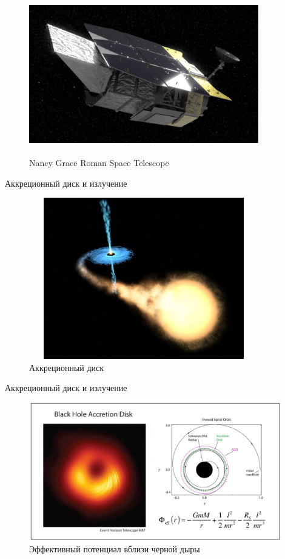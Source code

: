 \documentclass[
]{beamer}
\begin{document}
\begin{frame}
\begin{figure}[H]
	\centering
	\includegraphics[width=10cm, height=7cm]{Wfirst_beauty1_prores_1920x1080mov_.00_00_17_16.still003_crop.jpg}
	\caption{Nancy Grace Roman Space Telescope}
\end{figure}
\end{frame}
\begin{frame}{Аккреционный диск и излучение}
\begin{figure}[H]
	\centering
	\includegraphics[width=10cm, height=7cm]{500px-accretion_disk-1.jpg}
	\caption{Аккреционный диск}
\end{figure}
\end{frame}
\begin{frame}{Аккреционный диск и излучение}
	\begin{figure}[H]
		\centering
		\includegraphics[width=11cm, height=6cm]{accretiondisk-2.jpg}
		\caption{Эффективный потенциал вблизи черной дыры}
	\end{figure}
\end{frame}
\end{document}
